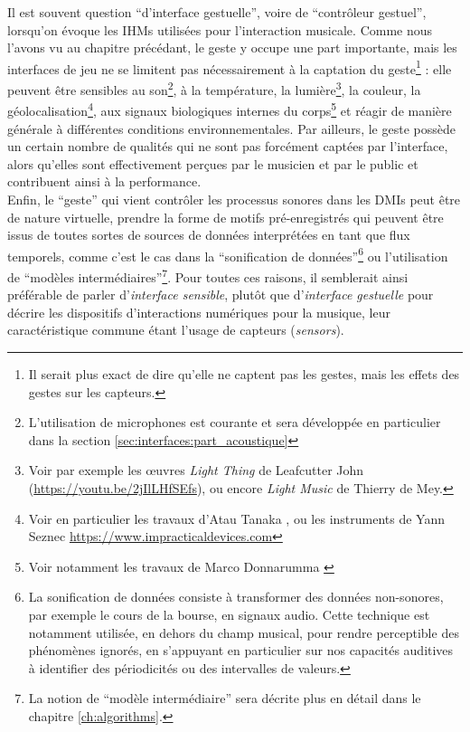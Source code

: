 \noindent Il est souvent question ``d'interface gestuelle'', voire de ``contrôleur gestuel'', lorsqu'on évoque les \glspl{IHM} utilisées pour l'interaction musicale. Comme nous l'avons vu au chapitre précédant, le geste y occupe une part importante, mais les interfaces de jeu ne 
se limitent pas nécessairement à la captation du geste\footnote{Il serait plus exact de dire qu'elle ne captent pas les gestes, mais les effets des gestes sur les capteurs.} : elle peuvent être sensibles au son\footnote{L'utilisation de microphones est courante et sera développée en particulier dans la section \ref{sec:interfaces:part_acoustique}}, à la température, la lumière\footnote{Voir par exemple les œuvres \textit{Light Thing} de Leafcutter John (\url{https://youtu.be/2jIlLHfSEfs}), ou encore \textit{Light Music} de Thierry de Mey.}, la couleur, la géolocalisation\footnote{Voir en particulier les travaux d'Atau Tanaka \cite{tanaka_mobile_2004}, ou les instruments de Yann Seznec \url{https://www.impracticaldevices.com}}, aux signaux biologiques internes du corps\footnote{Voir notamment les travaux de Marco Donnarumma \cite{donnarumma_biophysical_2017}} et réagir de manière générale à différentes conditions environnementales. Par ailleurs, le geste possède un certain nombre de qualités qui ne sont pas forcément captées par l'interface, alors qu'elles sont effectivement perçues par le musicien et par le public et contribuent ainsi à la performance.\\
\indent Enfin, le ``geste'' qui vient contrôler les processus sonores dans les \glspl{DMI} peut être de nature virtuelle, prendre la forme de motifs pré-enregistrés qui peuvent être issus de toutes sortes de sources de données interprétées en tant que flux temporels, comme c'est le cas dans la ``sonification de données''\footnote{La sonification de données consiste à transformer des données non-sonores, par exemple le cours de la bourse, en signaux audio. Cette technique est notamment utilisée, en dehors du champ musical, pour rendre perceptible des phénomènes ignorés, en s'appuyant en particulier sur nos capacités auditives à identifier des périodicités ou des intervalles de valeurs.} ou l'utilisation de ``modèles intermédiaires''\footnote{La notion de ``modèle intermédiaire'' sera décrite plus en détail dans le chapitre \ref{ch:algorithms}.}. Pour toutes ces raisons, il semblerait ainsi préférable de parler d'\textit{interface sensible}, plutôt que d'\textit{interface gestuelle} pour décrire les dispositifs d'interactions numériques pour la musique, leur caractéristique commune étant l'usage de capteurs (\textit{sensors}).\\
